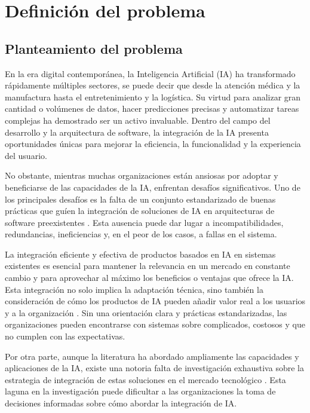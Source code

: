 \section{Definición del problema}

\subsection{Planteamiento del problema}
En la era digital contemporánea, la Inteligencia Artificial (IA) ha transformado rápidamente múltiples sectores, se puede decir que desde la atención médica y la manufactura hasta el entretenimiento y la logística. Su virtud para analizar gran cantidad o volúmenes de datos, hacer predicciones precisas y automatizar tareas complejas ha demostrado ser un activo invaluable. Dentro del campo del desarrollo y la arquitectura de software, la integración de la IA presenta oportunidades únicas para mejorar la eficiencia, la funcionalidad y la experiencia del usuario.

No obstante, mientras muchas organizaciones están ansiosas por adoptar y beneficiarse de las capacidades de la IA, enfrentan desafíos significativos. Uno de los principales desafíos es la falta de un conjunto estandarizado de buenas prácticas que guíen la integración de soluciones de IA en arquitecturas de software preexistentes \citep{Wang2016ImplementingOutlook}. Esta ausencia puede dar lugar a incompatibilidades, redundancias, ineficiencias y, en el peor de los casos, a fallas en el sistema.

La integración eficiente y efectiva de productos basados en IA en sistemas existentes es esencial para mantener la relevancia en un mercado en constante cambio y para aprovechar al máximo los beneficios o ventajas que ofrece la IA. Esta integración no solo implica la adaptación técnica, sino también la consideración de cómo los productos de IA pueden añadir valor real a los usuarios y a la organización \citep{Cui2022ConstructionIntelligence}. Sin una orientación clara y prácticas estandarizadas, las organizaciones pueden encontrarse con sistemas sobre complicados, costosos y que no cumplen con las expectativas.

Por otra parte, aunque la literatura ha abordado ampliamente las capacidades y aplicaciones de la IA, existe una notoria falta de investigación exhaustiva sobre la estrategia de integración de estas soluciones en el mercado tecnológico \citep{Cui2022ConstructionIntelligence}. Esta laguna en la investigación puede dificultar a las organizaciones la toma de decisiones informadas sobre cómo abordar la integración de IA.

